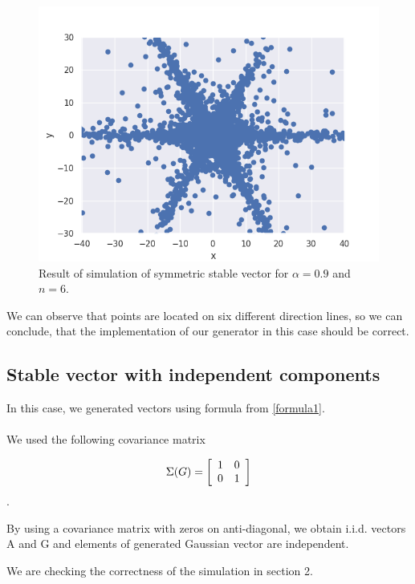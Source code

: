 \documentclass{article}
\begin{document}
	\begin{figure}[H]
		\centering
		\includegraphics[width=1\linewidth]{images/ex_1_a_alpha_stable_vector_simulation_symmetric_discreet_scatter.png}
		\caption{Result of simulation of symmetric stable vector for $\alpha=0.9$ and $n=6$.}\label{1}
	\end{figure}
	
	We can observe that points are located on six different direction lines, so we can conclude, that the implementation of our generator in this case should be correct.
	
	\subsection{Stable vector with independent components}
	
	In this case, we generated vectors using formula from \ref{formula1}. 
	\\ \\
	We used the following covariance matrix 
	
	\[\Sigma(G) = \left[{\begin{array}{*{20}c}
			1 & 0\\
			0 & 1\end{array} } \right]\]. 
	
	By using a covariance matrix with zeros on anti-diagonal, we obtain i.i.d. vectors A and G and elements of generated Gaussian vector are independent.
	
	We are checking the correctness of the simulation in section 2.
	
\end{document}
